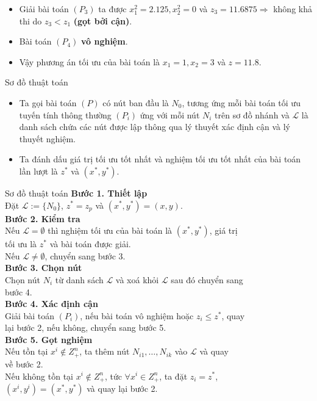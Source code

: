 \documentclass{beamer}
\begin{document}
\begin{frame}
    \begin{itemize} 
    \item Giải bài toán $(P_3)$ ta được $x^2_1=2.125, x^2_2=0$ và $z_3=11.6875 \Rightarrow $ không khả thi do $z_3 < z_1$ \textbf{(gọt bởi cận)}. 
    \item Bài toán $(P_4)$ \textbf{vô nghiệm}.
    \item Vậy phương án tối ưu của bài toán là $x_1=1, x_2=3$ và $z=11.8$.
\end{itemize}
\end{frame}

\begin{frame}{Sơ đồ thuật toán}
\begin{itemize}
\item Ta gọi bài toán $(P)$ có nút ban đầu là $N_0$, tương ứng mỗi bài toán tối ưu tuyến tính thông thường $(P_i)$ ứng với mỗi nút $N_i$ trên sơ đồ nhánh và $\mathcal{L}$ là danh sách chứa các nút được lập thông qua lý thuyết xác định cận và lý thuyết nghiệm.
\item Ta đánh dấu giá trị tối ưu tốt nhất và nghiệm tối ưu tốt nhất của bài toán lần lượt là $z^*$ và $(x^*,y^*)$.
\end{itemize}
\end{frame}

\begin{frame}{Sơ đồ thuật toán}
\small
\setlength{\parindent}{4em}
\noindent \textbf{Bước 1. Thiết lập} \\
Đặt $\mathcal{L}:=\{N_0 \}$, $z^*=z_p$ và $(x^*,y^*)=(x,y)$. \\
\noindent \textbf{Bước 2. Kiểm tra} \\
Nếu $\mathcal{L} = \emptyset$ thì nghiệm tối ưu của bài toán là $(x^*,y^*)$, giá trị \\ tối ưu là $z^*$ và bài toán được giải. \\
Nếu $\mathcal{L} \neq \emptyset$, chuyển sang bước 3. \\ 
\noindent \textbf{Bước 3. Chọn nút} \\
Chọn nút $N_i$ từ danh sách $\mathcal{L}$ và xoá khỏi $\mathcal{L}$ sau đó chuyển sang \\ bước 4. \\ 
\noindent \textbf{Bước 4. Xác định cận} \\ 
Giải bài toán $(P_i)$, nếu bài toán vô nghiệm hoặc $z_i \leq z^*$, quay \\ lại bước 2, nếu không, chuyển sang bước 5. \\ 
\noindent \textbf{Bước 5. Gọt nghiệm} \\
Nếu tồn tại $x^i \notin Z^n_+$, ta thêm nút $N_{i1}, \ldots , N_{ik}$ vào $\mathcal{L}$ và quay \\ về bước 2. \\
Nếu không tồn tại $x^i \notin Z^n_+$, tức $\forall x^i \in Z^n_+$, ta đặt $z_i = z^*$, \\ $(x^i,y^i) = (x^*,y^*)$ và quay lại bước 2.
\end{frame}    
\end{document}
